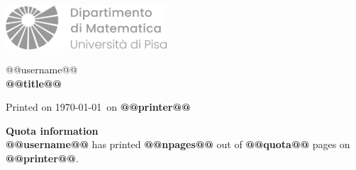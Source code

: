 \documentclass[a4paper]{article}
\begin{document}
    \thispagestyle{empty}
    \sffamily

    \hfill \includegraphics[width=6cm]{banner-logo-transparent}
    \vspace{3cm}
    \begin{center}
        \Huge
        @@username@@ \\[2cm]
        \textbf{@@title@@} \\[4cm]     
    \end{center}

    \Large
    \noindent Printed on \today\ on \textbf{@@printer@@} \\[2cm]

    \vfill

    \noindent \textbf{Quota information} \\[.05cm]
    \noindent \textbf{@@username@@} has printed 
    \textbf{@@npages@@} out of \textbf{@@quota@@}
    pages on \textbf{@@printer@@}.
\end{document}
